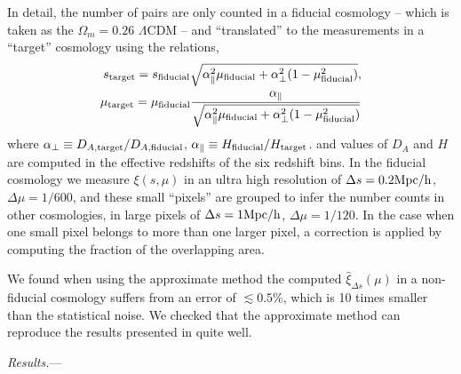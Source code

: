 \documentclass[prl,twocolumn,superscriptaddress,aps,amsmath,amssymb,nofootinbib,altaffilletter]{revtex4}
\begin{document}
In detail, the number of pairs are only counted in a fiducial cosmology
-- which is taken as the $\Omega_m=0.26$ $\Lambda$CDM --
and ``translated'' to the measurements in a ``target'' cosmology using the relations, 
\begin{eqnarray}
 s_{\rm target} = s_{\rm fiducial} \sqrt{\alpha_{\parallel}^2 \mu_{\rm fiducial}+\alpha_{\bot}^2(1-\mu_{\rm fiducial}^2)}, \\
 \mu_{\rm target} = \mu_{\rm fiducial} \frac{\alpha_\parallel}
 {\sqrt{\alpha_{\parallel}^2 \mu_{\rm fiducial} +\alpha_{\bot}^2(1-\mu_{\rm fiducial}^2)}}
\end{eqnarray}
where $\alpha_{\bot}\equiv D_{A,\rm target}/D_{A,\rm fiducial}$,
$\alpha_{\parallel}\equiv H_{\rm fiducial}/H_{\rm target}$.
and values of $D_A$ and $H$ are computed in the effective redshifts of the six redshift bins.
In the fiducial cosmology
we measure $\xi(s,\mu)$ in an ultra high resolution of
$\Delta s = 0.2 {\rm Mpc/h}$, $\Delta \mu = 1/600$,
and these small ``pixels'' are grouped to infer 
the number counts in other cosmologies, 
in large pixels of $\Delta s = 1 {\rm Mpc/h}$, $\Delta \mu = 1/120$.
In the case when one small pixel belongs to more than one larger pixel,
a correction is applied by computing the fraction of the overlapping area.

We found when using the approximate method the computed 
$\hat\xi_{\Delta s}(\mu)$ in a non-fiducial cosmology suffers from
an error of $\lesssim0.5\%$, which is 10 times smaller than 
the statistical noise.
We checked that the approximate method can reproduce the results presented in \cite{Li2016} quite well.





{\it Results.}---
\end{document}
